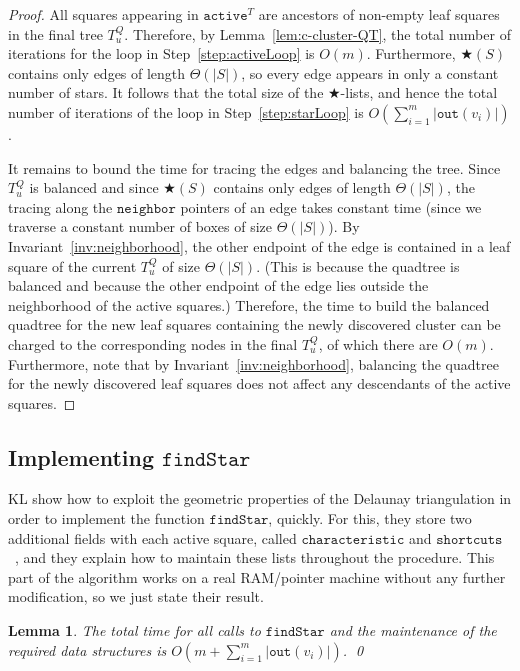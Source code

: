\documentclass[11pt]{paper}
\newtheorem {lem}[theorem] {Lemma}
\begin{document}
\begin{proof}
All squares appearing in $\texttt{active}^T$ are ancestors of non-empty
leaf squares in the final tree $T_u^Q$. Therefore, by
Lemma~\ref{lem:c-cluster-QT},
the total number of iterations for the loop in
Step~\ref{step:activeLoop} is $O(m)$. Furthermore, 
$\bigstar(S)$ contains only edges of length $\Theta(|S|)$, so every
edge appears in only a constant number of stars. It follows that the
total size of the $\bigstar$-lists, and hence the total number of
iterations of the loop in Step~\ref{step:starLoop} is
$O(\sum_{i=1}^{m} |\texttt{out}(v_i)|)$.

It remains to bound the time for tracing the edges and balancing the
tree.  Since $T_u^Q$ is balanced and since $\bigstar(S)$ contains
only edges of length $\Theta(|S|)$, the tracing along the $\texttt{neighbor}$
pointers of an edge takes constant time (since we traverse a constant number
of boxes of size $\Theta(|S|)$). By Invariant~\ref{inv:neighborhood},
the other endpoint of the edge  is contained in a leaf square
of the current $T_u^Q$ of size $\Theta(|S|)$. (This is because the quadtree
is balanced and because the other endpoint of the edge lies outside
the neighborhood of the active squares.) Therefore, the time to build
the balanced
quadtree for the new leaf squares containing the newly discovered cluster
can be charged to the corresponding nodes in the final $T_u^Q$, of which
there are $O(m)$. Furthermore, note that by
Invariant~\ref{inv:neighborhood}, balancing the quadtree for the newly
discovered leaf squares does not affect any descendants of the active
squares.
\end{proof}

\subsection {Implementing $\texttt{findStar}$}

KL show how to exploit the geometric properties of the Delaunay triangulation
in order to implement the function $\texttt{findStar}$,
quickly. For this, they store two additional fields with each
active square, called $\texttt{characteristic}$ and
$\texttt{shortcuts}$~\cite[Section~6]{KrznaricLe98}, and they explain how to
maintain these lists throughout the procedure. This part of the algorithm works 
on a real RAM/pointer machine without any further modification, so we 
just state their result.
\begin{lem}\label{lem:findStar}
The total time for all calls to \emph{$\texttt{findStar}$} and the
maintenance of the required data structures is
\emph{$O(m + \sum_{i=1}^{m} |\texttt{out}(v_i)|)$}.
\qed
\end{lem}
\end{document}
